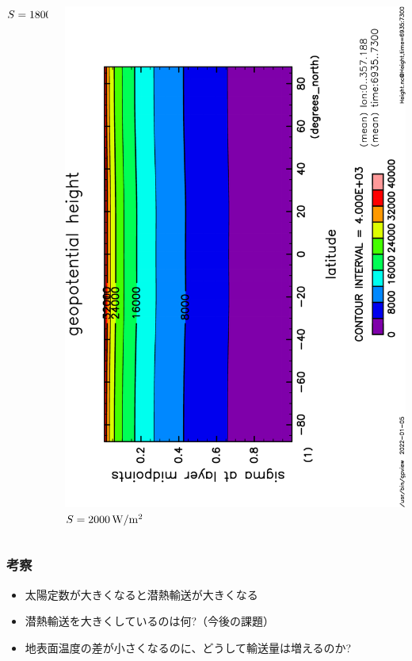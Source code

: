 \documentclass[aspectratio=149,9pt,fleqn]{beamer}
\begin{document}
\begin{frame}
\begin{columns}[T]
\begin{column}{.3\textwidth}
			\(S=1800\hmu{W/m^2}\)
		\end{column}
		\begin{column}{.3\textwidth}
			\centering
			\includegraphics[height=\textwidth,angle=-90]{S2000/Height,time=6935:7300-crop.pdf}
			\(S=2000\hmu{W/m^2}\)
		\end{column}
	\end{columns}
\end{frame}

\begin{frame}
	\frametitle{考察}
	\begin{itemize}
		\item 太陽定数が大きくなると潜熱輸送が大きくなる
		\item 潜熱輸送を大きくしているのは何?（今後の課題）
		\item 地表面温度の差が小さくなるのに、どうして輸送量は増えるのか?
	\end{itemize}
\end{frame}
\end{document}
